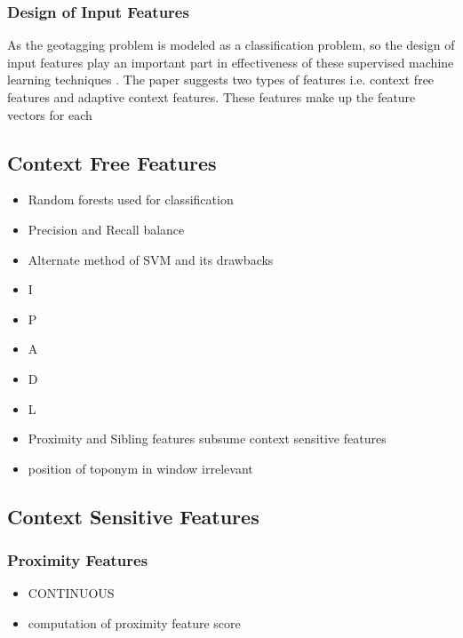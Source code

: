 \documentclass[
     11pt,         %
     a4paper,      %
     oneside,
     ]{article}
\begin{document}
\subsubsection{Design of Input Features}
As the geotagging problem is modeled as a classification problem, so the design of input features play an important part in effectiveness of these supervised machine learning techniques \cite{Lieberman12adaptivecontext}. The paper suggests two types of features i.e. context free features and adaptive context features. These features make up the feature vectors for each 

\subsection{Context Free Features}
\begin{itemize}
	
	\item Random forests used for classification
	\item Precision and Recall balance
	\item Alternate method of SVM and its drawbacks
\end{itemize}
\begin{itemize}
	\item I
	\item P
	\item A
	\item D
	\item L
\end{itemize}

\begin{itemize}
	\item Proximity and Sibling features subsume context sensitive features
	\item position of toponym in window irrelevant
\end{itemize}

\subsection{Context Sensitive Features}
\subsubsection{Proximity Features}
\begin{itemize}
	\item CONTINUOUS
	\item computation of proximity feature score
\end{itemize}
\end{document}
